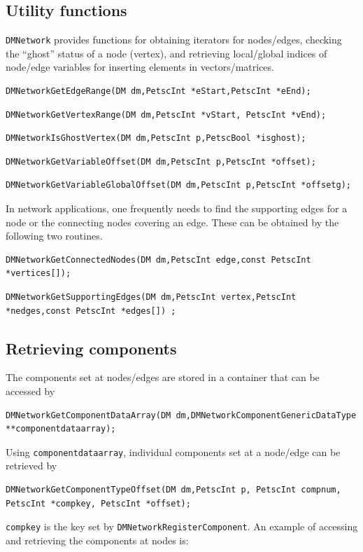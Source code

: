 {\subsection{Utility functions}
  \lstinline{DMNetwork} provides functions for obtaining iterators for nodes/edges, checking the ``ghost''
  status of a node (vertex), and retrieving local/global indices of node/edge variables for inserting
  elements in vectors/matrices.
\begin{lstlisting}
DMNetworkGetEdgeRange(DM dm,PetscInt *eStart,PetscInt *eEnd);
\end{lstlisting}
\begin{lstlisting}
DMNetworkGetVertexRange(DM dm,PetscInt *vStart, PetscInt *vEnd);
\end{lstlisting}
\begin{lstlisting}
DMNetworkIsGhostVertex(DM dm,PetscInt p,PetscBool *isghost);
\end{lstlisting}
\begin{lstlisting}
DMNetworkGetVariableOffset(DM dm,PetscInt p,PetscInt *offset);
\end{lstlisting}
\begin{lstlisting}
DMNetworkGetVariableGlobalOffset(DM dm,PetscInt p,PetscInt *offsetg);
\end{lstlisting}
In network applications, one frequently needs to find the supporting edges for a node or
the connecting nodes covering an edge. These can be obtained by the following two routines.
\begin{lstlisting}
DMNetworkGetConnectedNodes(DM dm,PetscInt edge,const PetscInt *vertices[]);
\end{lstlisting}
\begin{lstlisting}
DMNetworkGetSupportingEdges(DM dm,PetscInt vertex,PetscInt *nedges,const PetscInt *edges[]) ;
\end{lstlisting}

\subsection{Retrieving components}
The components set at nodes/edges are stored in a container that can be accessed by
\begin{lstlisting}
DMNetworkGetComponentDataArray(DM dm,DMNetworkComponentGenericDataType **componentdataarray);
\end{lstlisting}
  Using \lstinline{componentdataarray}, individual components set at a node/edge can be retrieved by
\begin{lstlisting}
DMNetworkGetComponentTypeOffset(DM dm,PetscInt p, PetscInt compnum, PetscInt *compkey, PetscInt *offset);
\end{lstlisting}
\lstinline{compkey} is the key set by \lstinline{DMNetworkRegisterComponent}. An example of accessing and retrieving the components at nodes is:

}
